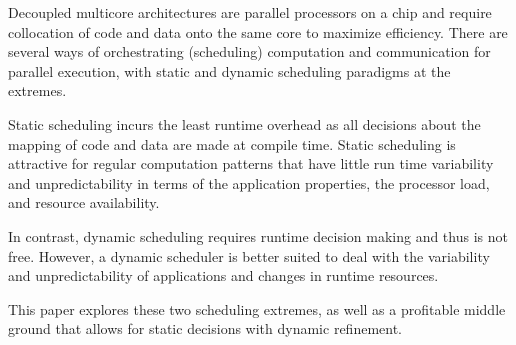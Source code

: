 Decoupled multicore architectures are parallel processors on a chip
and require collocation of code and data onto the same core to
maximize efficiency. There are several ways of orchestrating
(scheduling) computation and communication for parallel execution,
with static and dynamic scheduling paradigms at the extremes.

Static scheduling incurs the least runtime overhead as all decisions
about the mapping of code and data are made at compile time. Static
scheduling is attractive for regular computation patterns that have
little run time variability and unpredictability in terms of the
application properties, the processor load, and resource availability.

In contrast, dynamic scheduling requires runtime decision making and
thus is not free. However, a dynamic scheduler is better suited to
deal with the variability and unpredictability of applications and
changes in runtime resources.

This paper explores these two scheduling extremes, as well as a
profitable middle ground that allows for static decisions with dynamic
refinement.